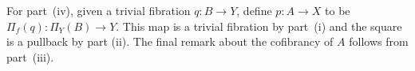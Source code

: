\documentclass[reqno,10pt,a4paper,oneside]{amsart}
\makeatletter
\renewenvironment{proof}[1][\proofname] {\par\pushQED{\qed}\normalfont\topsep6\p@\@plus6\p@\relax\trivlist\item[\hskip\labelsep\bf#1\@addpunct{.}]\ignorespaces}{\popQED\endtrivlist\@endpefalse}
\numberwithin{equation}{section}
\theoremstyle{mythm}
\theoremstyle{mydef}
\theoremstyle{myrmk}
\newcommand{\pullback}[1]{\save*!/#1-1.2pc/#1:(-1,1)@^{|-}\restore}
\newcommand{\drpullback}{\pullback{dr}}
\newcommand{\ie}{\text{i.e.\ }}
\newcommand{\co}{\colon}
\makeatother
\begin{document}
\begin{proof}

For part~(iv), given a trivial fibration $q \co B \to Y$, define $p \co A \to X$ to  be $\Pi_f(q) \co \Pi_Y(B) \to Y$. This map is a trivial fibration by part~(i) and the square is a pullback by part (ii). The final remark about the cofibrancy of $A$ follows from part~(iii). \qedhere
\end{proof}
\end{document}
